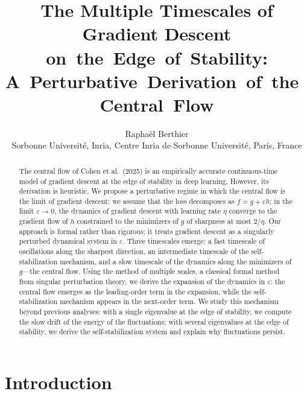 \documentclass[11pt,english,reqno]{article}
\author{}
\theoremstyle{plain}
\theoremstyle{definition}
\theoremstyle{remark}
\numberwithin{equation}{section}
\begin{document}
\title{The Multiple Timescales of Gradient Descent on~the~Edge~of~Stability: A~Perturbative~Derivation~of~the~Central~Flow}

\author{Raphaël Berthier\\
\small
Sorbonne Université, Inria, Centre Inria de Sorbonne Université, Paris, France}

\maketitle

\begin{abstract}
    The central flow of Cohen et al.~(2025) is an empirically accurate continuous-time model of gradient descent at the edge of stability in deep learning, However, its derivation is heuristic. We propose a perturbative regime in which the central flow is the limit of gradient descent: we assume that the loss decomposes as $f = g + \varepsilon h$; in the limit $\varepsilon \to 0$, the dynamics of gradient descent with learning rate $\eta$ converge to the gradient flow of $h$ constrained to the minimizers of $g$ of sharpness at most $2/\eta$. Our approach is formal rather than rigorous; it treats gradient descent as a singularly perturbed dynamical system in $\varepsilon$. Three timescales emerge: a fast timescale of oscillations along the sharpest direction, an intermediate timescale of the self-stabilization mechanism, and a slow timescale of the dynamics along the minimizers of $g$---the central flow. Using the method of multiple scales, a classical formal method from singular perturbation theory, we derive the expansion of the dynamics in $\varepsilon$: the central flow emerges as the leading-order term in the expansion, while the self-stabilization mechanism appears in the next-order term. We study this mechanism beyond previous analyses: with a single eigenvalue at the edge of stability, we compute the slow drift of the energy of the fluctuations; with several eigenvalues at the edge of stability, we derive the self-stabilization system and explain why fluctuations persist.
\end{abstract}


\noindent

\tableofcontents

\section{Introduction}
\end{document}
